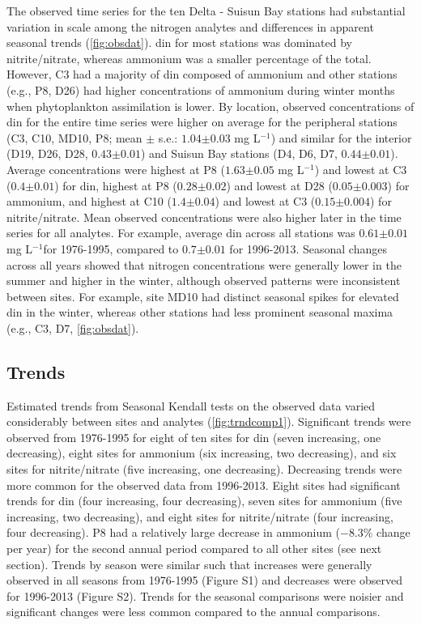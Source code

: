 \documentclass[letterpaper,12pt,oneside]{article}\usepackage[]{graphicx}\usepackage[]{color}
\newcommand{\mgl}{mg L$^{-1}$}
\begin{document}
The observed time series for the ten Delta - Suisun Bay stations had substantial variation in scale among the nitrogen analytes and differences in apparent seasonal trends (\cref{fig:obsdat}).  \ac{din} for most stations was dominated by nitrite/nitrate, whereas ammonium was a smaller percentage of the total.  However, C3 had a majority of \ac{din} composed of ammonium and other stations (e.g., P8, D26) had higher concentrations of ammonium during winter months when phytoplankton assimilation is lower\cite{Novick15}.  By location, observed concentrations of \ac{din} for the entire time series were higher on average for the peripheral stations (C3, C10, MD10, P8; mean $\pm$ s.e.: $1.04$$\pm$$0.03$ \mgl) and similar for the interior (D19, D26, D28, $0.43$$\pm$$0.01$) and Suisun Bay stations (D4, D6, D7, $0.44$$\pm$$0.01$).  Average concentrations were highest at P8 ($1.63$$\pm$$0.05$ \mgl) and lowest at C3 ($0.4$$\pm$$0.01$) for \ac{din}, highest at P8 ($0.28$$\pm$$0.02$) and lowest at D28 ($0.05$$\pm$$0.003$) for ammonium, and highest at C10 ($1.4$$\pm$$0.04$) and lowest at C3 ($0.15$$\pm$$0.004$) for nitrite/nitrate. Mean observed concentrations were also higher later in the time series for all analytes.  For example, average \ac{din} across all stations was $0.61$$\pm$$0.01$ \mgl for 1976-1995, compared to $0.7$$\pm$$0.01$ for 1996-2013. Seasonal changes across all years showed that nitrogen concentrations were generally lower in the summer and higher in the winter, although observed patterns were inconsistent between sites.  For example, site MD10 had distinct seasonal spikes for elevated \ac{din} in the winter, whereas other stations had less prominent seasonal maxima (e.g., C3, D7, \cref{fig:obsdat}).  

\subsection{Trends}



Estimated trends from Seasonal Kendall tests on the observed data varied considerably between sites and analytes (\cref{fig:trndcomp1}). Significant trends were observed from 1976-1995 for eight of ten sites for \ac{din} (seven increasing, one decreasing), eight sites for ammonium (six increasing, two decreasing), and six sites for nitrite/nitrate (five increasing, one decreasing).  Decreasing trends were more common for the observed data from 1996-2013.  Eight sites had significant trends for \ac{din} (four increasing, four decreasing), seven sites for ammonium (five increasing, two decreasing), and eight sites for nitrite/nitrate (four increasing, four decreasing). P8 had a relatively large decrease in ammonium ($-8.3$\% change per year) for the second annual period compared to all other sites (see next section). Trends by season were similar such that increases were generally observed in all seasons from 1976-1995 (Figure S1) and decreases were observed for 1996-2013 (Figure S2).  Trends for the seasonal comparisons were noisier and significant changes were less common compared to the annual comparisons.
\end{document}
